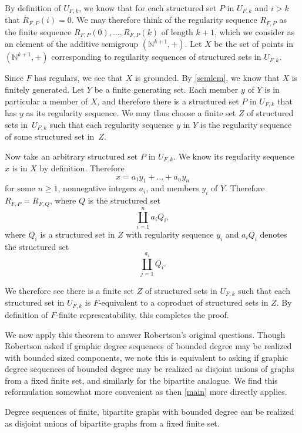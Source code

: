 \documentclass[review]{elsarticle}
\begin{document}

\begin{prf}
By definition
of $U_{F,k}$, we know that for each structured set $P$ in $U_{F,k}$ and $i>k$
that $R_{F,P}(i)=0$. We may therefore think of the regularity
sequence $R_{F,P}$ as the finite sequence
$R_{F,P}(0),\ldots,R_{F,P}(k)$ of length $k+1$, which we consider
as an element of the additive semigroup $(\mathbb{N}^{k+1},+)$. Let
$X$ be the set of points in $(\mathbb{N}^{k+1},+)$ corresponding to
regularity sequences of
structured sets in $U_{F,k}$.

Since $F$ has regulars, we see that $X$ is grounded.
By \ref{semlem}, we know that $X$ is finitely generated. Let $Y$
be a finite generating set. Each member $y$ of $Y$ is in particular a
member of $X$, and therefore there is a structured set $P$ in $U_{F,k}$ that
has $y$ as its regularity sequence. We may thus choose a finite set $Z$ of
structured sets in~$U_{F,k}$ such that each regularity sequence $y$ in $Y$ is the
regularity sequence of some structured set in~$Z$.

Now take an arbitrary structured set $P$ in $U_{F,k}$.
We know its regularity sequence
$x$ is in $X$ by definition. Therefore
$$x=a_1y_1+\ldots+a_ny_n$$
for some $n\ge 1$, nonnegative integers $a_i$, and members $y_i$ of $Y$.
Therefore $R_{F,P}=R_{F,Q}$, where $Q$ is the structured set
$$\coprod_{i=1}^n a_iQ_i,$$
where $Q_i$ is a structured set in $Z$ with regularity sequence $y_i$
and $a_iQ_i$ denotes the structured set
$$\coprod_{j=1}^{a_i}Q_i.$$

We therefore see there is a finite set $Z$ of structured sets in $U_{F,k}$
such that each structured set in $U_{F,k}$ is $F$-equivalent to a coproduct
of structured sets in $Z$. By definition of $F$-finite representability, this
completes the proof.
\end{prf}

We now apply this theorem to answer Robertson's original questions. Though
Robertson asked if graphic degree sequences of bounded degree may be
realized with bounded sized components, we note this is equivalent to asking
if graphic degree sequences of bounded degree may be realized as disjoint
unions of graphs from a fixed finite set, and similarly for the bipartite
analogue. We find this reformulation somewhat more convenient as then
\ref{main} more directly applies.

\begin{cor}\label{cor1}
Degree sequences of finite, bipartite graphs with bounded degree can be
realized as disjoint unions of bipartite graphs from a fixed finite set.
\end{cor}
\end{document}
